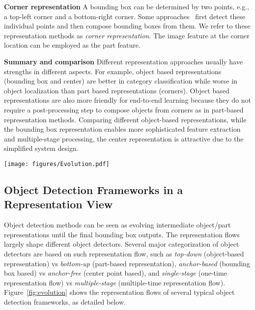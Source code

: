 \documentclass{article}
\def\eg{{e.g.}}
\begin{document}
{\noindent \textbf{Corner representation}}\hspace{3pt} A bounding box can be determined by two points, \eg, a top-left corner and a bottom-right corner. Some approaches~\cite{Denet,CornerNet,DBLP:journals/corr/abs-1904-08900,duan2019centernet,DBLP:conf/cvpr/LuLYLY19,zhou2019bottom,samet2020houghnet} first detect these individual points and then compose bounding boxes from them. We refer to these representation methods as \emph{corner representation}. The image feature at the corner location can be employed as the part feature.

{\noindent \textbf{Summary and comparison}}\hspace{3pt} Different representation approaches usually have strengths in different aspects. For example, object based representations (bounding box and center) are better in category classification while worse in object localization than part based representations (corners). Object based representations are also more friendly for end-to-end learning because they do not require a post-processing step to compose objects from corners as in part-based representation methods. Comparing different object-based representations, while the bounding box representation enables more sophisticated feature extraction and multiple-stage processing, the center representation is attractive due to the simplified system design.

\begin{figure*}[t]
\centering
\setlength{\abovecaptionskip}{0.cm}
\texttt{[image: figures/Evolution.pdf]}
\caption{Representation flows for several typical detection frameworks.}
\label{fig:evolution}
\vspace{-1em}
\end{figure*}
\vspace{-.5em}
\subsection{Object Detection Frameworks in a Representation View}
\label{framework}

Object detection methods can be seen as evolving intermediate object/part representations until the final bounding box outputs. The representation flows largely shape different object detectors. Several major categorization of object detectors are based on such representation flow, such as \emph{top-down} (object-based representation) vs \emph{bottom-up} (part-based representation), \emph{anchor-based} (bounding box based) vs \emph{anchor-free} (center point based), and \emph{single-stage} (one-time representation flow) vs \emph{multiple-stage} (multiple-time representation flow). Figure~\ref{fig:evolution} shows the representation flows of several typical object detection frameworks, as detailed below.
\end{document}
